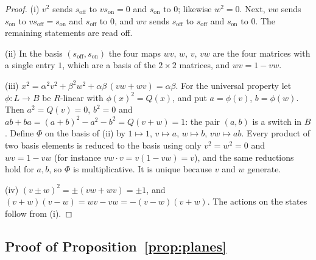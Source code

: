 \documentclass[11pt]{article}
\theoremstyle{plain}
\theoremstyle{definition}
\theoremstyle{plain}
\theoremstyle{definition}
\begin{document}
\begin{proof}
(i) $v^{2}$ sends $s_{\mathrm{off}}$ to $v s_{\mathrm{on}} = 0$ and $s_{\mathrm{on}}$ to $0$; likewise $w^{2} = 0$. Next, $vw$ sends $s_{\mathrm{on}}$ to $v s_{\mathrm{off}} = s_{\mathrm{on}}$ and $s_{\mathrm{off}}$ to $0$, and $wv$ sends $s_{\mathrm{off}}$ to $s_{\mathrm{off}}$ and $s_{\mathrm{on}}$ to $0$. The remaining statements are read off.

(ii) In the basis $(s_{\mathrm{off}}, s_{\mathrm{on}})$ the four maps $wv$, $w$, $v$, $vw$ are the four matrices with a single entry $1$, which are a basis of the $2 \times 2$ matrices, and $wv = 1 - vw$.

(iii) $x^{2} = \alpha^{2}v^{2} + \beta^{2}w^{2} + \alpha\beta\,(vw + wv) = \alpha\beta$. For the universal property let $\phi : L \to B$ be $R$-linear with $\phi(x)^{2} = Q(x)$, and put $a = \phi(v)$, $b = \phi(w)$. Then $a^{2} = Q(v) = 0$, $b^{2} = 0$ and $ab + ba = (a+b)^{2} - a^{2} - b^{2} = Q(v + w) = 1$: the pair $(a, b)$ is a switch in $B$. Define $\Phi$ on the basis of (ii) by $1 \mapsto 1$, $v \mapsto a$, $w \mapsto b$, $vw \mapsto ab$. Every product of two basis elements is reduced to the basis using only $v^{2} = w^{2} = 0$ and $wv = 1 - vw$ (for instance $vw \cdot v = v(1 - vw) = v$), and the same reductions hold for $a, b$, so $\Phi$ is multiplicative. It is unique because $v$ and $w$ generate.

(iv) $(v \pm w)^{2} = \pm(vw + wv) = \pm 1$, and $(v+w)(v-w) = wv - vw = -(v-w)(v+w)$. The actions on the states follow from (i).
\end{proof}

\subsection{\texorpdfstring{Proof of Proposition~\ref{prop:planes}}{Proof of Proposition 7.3}}\label{prf:prop:planes}
\end{document}
